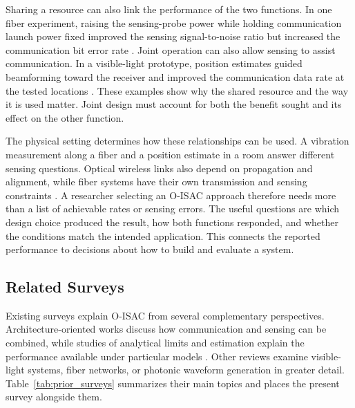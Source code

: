Sharing a resource can also link the performance of the two functions.
In one fiber experiment, raising the sensing-probe power while holding
communication launch power fixed improved the sensing signal-to-noise ratio
but increased the communication bit error rate \cite{OISAC_SCR00057}.
Joint operation can also allow sensing to assist communication. In a
visible-light prototype, position estimates guided beamforming toward the
receiver and improved the communication data rate at the tested locations
\cite{OISAC_SCR00196}. These examples show why the shared resource and the way
it is used matter. Joint design must account for both the benefit sought and
its effect on the other function.

The physical setting determines how these relationships can be used.
A vibration measurement along a fiber and a position estimate in a room
answer different sensing questions. Optical wireless links also depend on
propagation and alignment, while fiber systems have their own transmission
and sensing constraints \cite{OISAC_SCR00916,OISAC_SCR01085,Mohsan2026OISACReview}.
A researcher selecting an O-ISAC approach therefore needs more than a list
of achievable rates or sensing errors. The useful questions are which design
choice produced the result, how both functions responded, and whether the
conditions match the intended application. This connects the reported
performance to decisions about how to build and evaluate a system.

\subsection{Related Surveys}
\label{sec:related_surveys}

Existing surveys explain O-ISAC from several complementary perspectives.
Architecture-oriented works discuss how communication and sensing can be
combined, while studies of analytical limits and estimation explain the
performance available under particular models
\cite{Wen2024OISACArchitectures,Su2025OISACTheoryPractice,
Khorasgani2026GeneralOpticalISACSurvey}. Other reviews examine visible-light
systems, fiber networks, or photonic waveform generation in greater detail.
Table~\ref{tab:prior_surveys} summarizes their main topics and places the
present survey alongside them.

